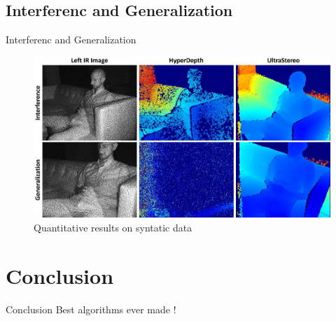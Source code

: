 \subsection{Interferenc and Generalization}
\begin{frame}{Interferenc and Generalization}
\begin{figure}
\includegraphics[scale=0.08]{pictures/fig8}
\caption{Quantitative results on syntatic data}
\end{figure}
\end{frame}

\section{Conclusion}
\begin{frame}{Conclusion}
Best algorithms ever made !
\end{frame}
